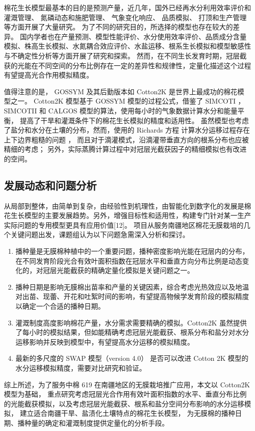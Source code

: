 棉花生长模型最基本的目的是预测产量，近几年，国外已经再水分利用效率评价和灌溉管理\cite{baumhardt2014,booker2014,booker2015,modala2015,thorp2015,anapalli2016,attia2016,linker2016,tsakmakis2018,thorp2019,thorp2020,thorp2020a}、
氮磷动态和施肥管理\cite{shumway2012,amin2017,arshad2017,zurweller2019}、
气象变化响应、
品质模拟、
打顶和生产管理\cite{yang2008}等方面开展了大量研究。
为了不同的研究目的，所选择的模型也存在较大的差异。
国内学者也在产量预测、模型性能评价、水分使用效率评价、品质成分含量模拟、株高生长模拟、水氮耦合效应评价、水盐运移、根系生长模拟和模型敏感性与不确定性分析等方面开展了研究和探索。
然而，在不同生长发育时期，冠层截获的光能在不同空间的分布比例存在一定的差异性和规律性，定量化描述这个过程有望提高光合作用模拟精度。

值得注意的是， GOSSYM 及其后勤版本如 Cotton2K 是世界上最成功的棉花模型之一。
Cotton2K 模型基于 GOSSYM 模型的过程公式，借鉴了 SIMCOTI ， SIMCOTII 和 CALGOS 模型的算法，使用每小时的气象数据计算水分和能量平衡，
提高了干旱和灌溉条件下的棉花生长模拟的精度和适用性。
虽然模型也考虑了盐分和水分在土壤的分布，然而，使用的 Richards 方程 \cite{richards1931} 计算水分运移过程存在上下边界粗糙的问题 \cite{thorp2014}，
而且对于滴灌模式，沿滴灌带垂直方向的根系分布也应被精细的考虑；
另外，实际蒸腾计算过程中对冠层光截获因子的精细模拟也有改进的空间。

\subsection{发展动态和问题分析}
从局部到整体，由简单到复杂，由经验性到机理性，由智能化到数字化的发展是棉花生长模型的主要发展趋势。另外，增强目标性和适用性，构建专门针对某一生产实际问题的专用模型更具有应用价值[12]。
项目从服务南疆地区棉花无膜栽培的几个关键问题出发，课题组认为以下问题急需深入分析和探讨。

\begin{enumerate}
    \item 播种量是无膜棉种植中的一个重要问题，播种密度影响光能在冠层内的分布，在不同发育阶段光合有效叶面积指数在冠层水平和垂直方向分布比例是动态变化的，对冠层光能截获的精确定量化模拟是关键问题之一。
    \item 播种日期是影响无膜棉出苗率和产量的关键因素，综合考虑光热效应以及地温对出苗、现蕾、开花和吐絮时间的影响，有望提高物候学发育阶段的模拟精度以确定一个合适的播种日期。
    \item 灌溉制度高度影响棉花产量，水分需求需要精确的模拟。Cotton2K 虽然提供了每小时的模拟结果，但如能精确考虑冠层光能截获、根系分布和盐分对水分运移影响并反映到模型中，有望提高水分运移的模拟精度。
    \item 最新的多尺度的 SWAP 模型（version 4.0）\cite{swap2021} 是否可以改进 Cotton 2K 模型的水分运移模拟精度，需要对比研究和验证。
\end{enumerate}

综上所述，为了服务中棉 619 在南疆地区的无膜栽培推广应用，本文以 Cotton2K 模型为基础，
重点研究考虑冠层光合作用有效叶面积指数的水平、垂直分布比例的光能截获模拟，以及考虑冠层光能截获、根系和盐分空间分布影响的水分运移模拟，
建立适合南疆干旱、盐渍化土壤特点的棉花生长模型，
为无膜棉的播种日期、播种量的确定和灌溉制度提供定量化的分析手段。
